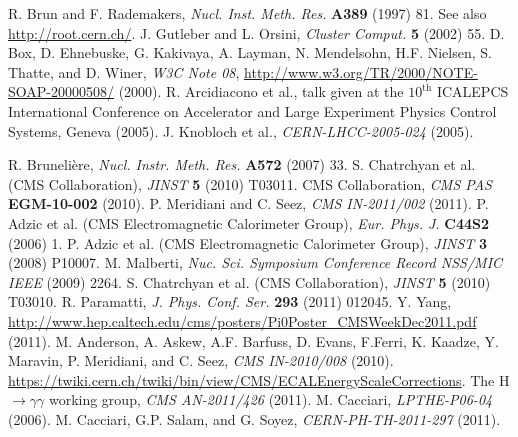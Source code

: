 \documentclass[12pt, letterpaper]{report}
\begin{document}
\begin{thebibliography}{99}
 R. Brun and F. Rademakers, \textit{Nucl. Inst. Meth. Res.} \textbf{A389} (1997) 81.  See also \url{http://root.cern.ch/}.
 J. Gutleber and L. Orsini, \textit{Cluster Comput.} \textbf{5} (2002) 55.
 D. Box, D. Ehnebuske, G. Kakivaya, A. Layman, N. Mendelsohn, H.F. Nielsen, S. Thatte, and D. Winer, \textit{W3C Note 08}, \url{http://www.w3.org/TR/2000/NOTE-SOAP-20000508/} (2000).
 R. Arcidiacono et al., talk given at the $10^{\mathrm{th}}$ ICALEPCS International Conference on Accelerator and Large Experiment Physics Control Systems, Geneva (2005).
 J. Knobloch et al., \textit{CERN-LHCC-2005-024} (2005).


 R. Bruneli\`ere, \textit{Nucl. Instr. Meth. Res.} \textbf{A572} (2007) 33.
 S. Chatrchyan et al. (CMS Collaboration), \textit{JINST} \textbf{5} (2010) T03011.
 CMS Collaboration, \textit{CMS PAS} \textbf{EGM-10-002} (2010).
 P. Meridiani and C. Seez, \textit{CMS IN-2011/002} (2011).
 P. Adzic et al. (CMS Electromagnetic Calorimeter Group), \textit{Eur. Phys. J.} \textbf{C44S2} (2006) 1.
 P. Adzic et al. (CMS Electromagnetic Calorimeter Group), \textit{JINST} \textbf{3} (2008) P10007.
 M. Malberti, \textit{Nuc. Sci. Symposium Conference Record NSS/MIC IEEE} (2009) 2264.
 S. Chatrchyan et al. (CMS Collaboration), \textit{JINST} \textbf{5} (2010) T03010.
 R. Paramatti, \textit{J. Phys. Conf. Ser.} \textbf{293} (2011) 012045.
 Y. Yang, \url{http://www.hep.caltech.edu/cms/posters/Pi0Poster_CMSWeekDec2011.pdf} (2011).
 M. Anderson, A. Askew, A.F. Barfuss, D. Evans, F.Ferri, K. Kaadze, Y. 
Maravin, P. Meridiani, and C. Seez, \textit{CMS IN-2010/008} (2010).
 \url{https://twiki.cern.ch/twiki/bin/view/CMS/ECALEnergyScaleCorrections}.
 The H$\rightarrow\gamma\gamma$ working group, \textit{CMS AN-2011/426} (2011).
 M. Cacciari, \textit{LPTHE-P06-04} (2006).
 M. Cacciari, G.P. Salam, and G. Soyez, \textit{CERN-PH-TH-2011-297} (2011).

\end{thebibliography}
\end{document}
